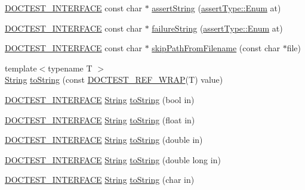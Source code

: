 \begin{DoxyCompactItemize}
\item 
\hyperlink{doctest_8h_a9c16ffc635ec47f07797d21ede26b1a5}{D\+O\+C\+T\+E\+S\+T\+\_\+\+I\+N\+T\+E\+R\+F\+A\+CE} const char $\ast$ \hyperlink{namespacedoctest_aa51be8558a5ec9675a77d2ecbc08e663}{assert\+String} (\hyperlink{namespacedoctest_1_1assertType_ae1bb5bed722f34f1c38b83cb19d326d3}{assert\+Type\+::\+Enum} at)
\item 
\hyperlink{doctest_8h_a9c16ffc635ec47f07797d21ede26b1a5}{D\+O\+C\+T\+E\+S\+T\+\_\+\+I\+N\+T\+E\+R\+F\+A\+CE} const char $\ast$ \hyperlink{namespacedoctest_a9d2d487c802fb0e66172a0ed2c9f76db}{failure\+String} (\hyperlink{namespacedoctest_1_1assertType_ae1bb5bed722f34f1c38b83cb19d326d3}{assert\+Type\+::\+Enum} at)
\item 
\hyperlink{doctest_8h_a9c16ffc635ec47f07797d21ede26b1a5}{D\+O\+C\+T\+E\+S\+T\+\_\+\+I\+N\+T\+E\+R\+F\+A\+CE} const char $\ast$ \hyperlink{namespacedoctest_adb4ee7dd3659dcc165944d73f6e29199}{skip\+Path\+From\+Filename} (const char $\ast$file)
\item 
{\footnotesize template$<$typename T $>$ }\\\hyperlink{classdoctest_1_1String}{String} \hyperlink{namespacedoctest_a8907bf35788959391343a2304f004e17}{to\+String} (const \hyperlink{doctest_8h_af2901cafb023c57fb672ccb1bf14f2eb}{D\+O\+C\+T\+E\+S\+T\+\_\+\+R\+E\+F\+\_\+\+W\+R\+AP}(T) value)
\item 
\hyperlink{doctest_8h_a9c16ffc635ec47f07797d21ede26b1a5}{D\+O\+C\+T\+E\+S\+T\+\_\+\+I\+N\+T\+E\+R\+F\+A\+CE} \hyperlink{classdoctest_1_1String}{String} \hyperlink{namespacedoctest_a70fd23e88074d38b9d61476005305df5}{to\+String} (bool in)
\item 
\hyperlink{doctest_8h_a9c16ffc635ec47f07797d21ede26b1a5}{D\+O\+C\+T\+E\+S\+T\+\_\+\+I\+N\+T\+E\+R\+F\+A\+CE} \hyperlink{classdoctest_1_1String}{String} \hyperlink{namespacedoctest_a68660ce630bd88a551ab3108709e6592}{to\+String} (float in)
\item 
\hyperlink{doctest_8h_a9c16ffc635ec47f07797d21ede26b1a5}{D\+O\+C\+T\+E\+S\+T\+\_\+\+I\+N\+T\+E\+R\+F\+A\+CE} \hyperlink{classdoctest_1_1String}{String} \hyperlink{namespacedoctest_a43b51978c9505f682cbff9462a02f8af}{to\+String} (double in)
\item 
\hyperlink{doctest_8h_a9c16ffc635ec47f07797d21ede26b1a5}{D\+O\+C\+T\+E\+S\+T\+\_\+\+I\+N\+T\+E\+R\+F\+A\+CE} \hyperlink{classdoctest_1_1String}{String} \hyperlink{namespacedoctest_ae4e12dd9865bb31f417f9df0c41813cf}{to\+String} (double long in)
\item 
\hyperlink{doctest_8h_a9c16ffc635ec47f07797d21ede26b1a5}{D\+O\+C\+T\+E\+S\+T\+\_\+\+I\+N\+T\+E\+R\+F\+A\+CE} \hyperlink{classdoctest_1_1String}{String} \hyperlink{namespacedoctest_af106dff2a0c068d301349b754c466378}{to\+String} (char in)

\end{DoxyCompactItemize}
